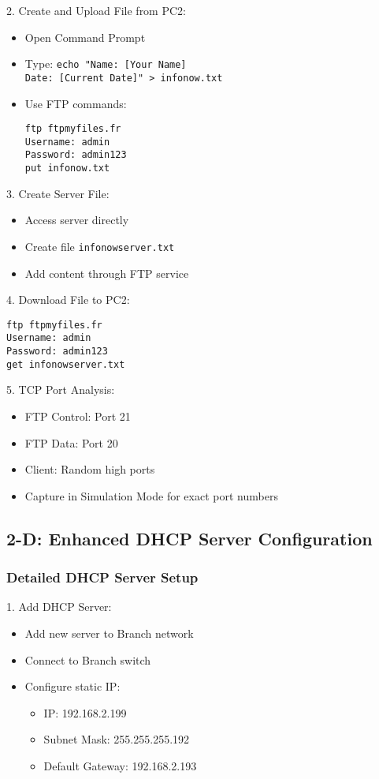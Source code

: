 \documentclass[12pt]{article}
\begin{document}
2. Create and Upload File from PC2:
   \begin{itemize}
   \item Open Command Prompt
   \item Type: \texttt{echo "Name: [Your Name] \\ Date: [Current Date]" > infonow.txt}
   \item Use FTP commands:
   \begin{lstlisting}[frame=single]
ftp ftpmyfiles.fr
Username: admin
Password: admin123
put infonow.txt
\end{lstlisting}
   \end{itemize}

3. Create Server File:
   \begin{itemize}
   \item Access server directly
   \item Create file \texttt{infonowserver.txt}
   \item Add content through FTP service
   \end{itemize}

4. Download File to PC2:
\begin{lstlisting}[frame=single]
ftp ftpmyfiles.fr
Username: admin
Password: admin123
get infonowserver.txt
\end{lstlisting}

5. TCP Port Analysis:
   \begin{itemize}
   \item FTP Control: Port 21
   \item FTP Data: Port 20
   \item Client: Random high ports
   \item Capture in Simulation Mode for exact port numbers
   \end{itemize}

\subsection{2-D: Enhanced DHCP Server Configuration}

\subsubsection{Detailed DHCP Server Setup}
1. Add DHCP Server:
   \begin{itemize}
   \item Add new server to Branch network
   \item Connect to Branch switch
   \item Configure static IP:
     \begin{itemize}
     \item IP: 192.168.2.199
     \item Subnet Mask: 255.255.255.192
     \item Default Gateway: 192.168.2.193
     \end{itemize}
   \end{itemize}
\end{document}
